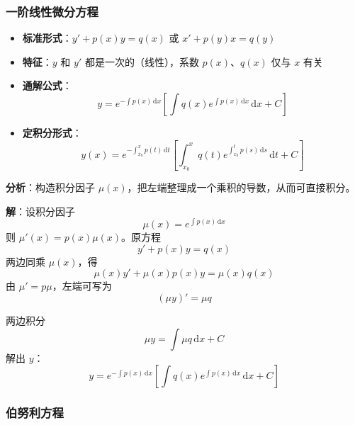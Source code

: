 \documentclass[../book.tex]{subfiles}
\begin{document}
    \subsubsection{一阶线性微分方程}

    \begin{itemize}
        \item \textbf{标准形式}：$y' + p(x)y = q(x)$ 或 $x' + p(y)x = q(y)$
        \item \textbf{特征}：$y$ 和 $y'$ 都是一次的（线性），系数 $p(x)$、$q(x)$ 仅与 $x$ 有关
        \item \textbf{通解公式}：
        \[
            y = e^{-\int p(x)\,\mathrm{d}x}\left[\int q(x)e^{\int p(x)\,\mathrm{d}x}\,\mathrm{d}x + C\right]
        \]
        \item \textbf{定积分形式}：
        \[
            y(x) = e^{-\int_{x_0}^{x} p(t)\,\mathrm{d}t}\left[\int_{x_0}^{x} q(t)e^{\int_{x_0}^{t} p(s)\,\mathrm{d}s}\,\mathrm{d}t + C\right]
        \]
    \end{itemize}

    \begin{analysisbox}
        \textbf{分析}：构造积分因子 $\mu(x)$，把左端整理成一个乘积的导数，从而可直接积分。

        \textbf{解}：设积分因子
        \[
            \mu(x)=e^{\int p(x)\,\mathrm{d}x}
        \]
        则 $\mu'(x)=p(x)\mu(x)$。原方程
        \[
            y' + p(x)y = q(x)
        \]
        两边同乘 $\mu(x)$，得
        \[
            \mu(x)y' + \mu(x)p(x)y = \mu(x)q(x)
        \]
        由 $\mu'=p\mu$，左端可写为
        \[
            (\mu y)'=\mu q
        \]

        两边积分
        \[
            \mu y=\int \mu q\,\mathrm{d}x + C
        \]
        解出 $y$：
        \[
            y=e^{-\int p(x)\,\mathrm{d}x}\left[\int q(x)e^{\int p(x)\,\mathrm{d}x}\,\mathrm{d}x+C\right]
        \]
    \end{analysisbox}

    \subsubsection{伯努利方程}
\end{document}
